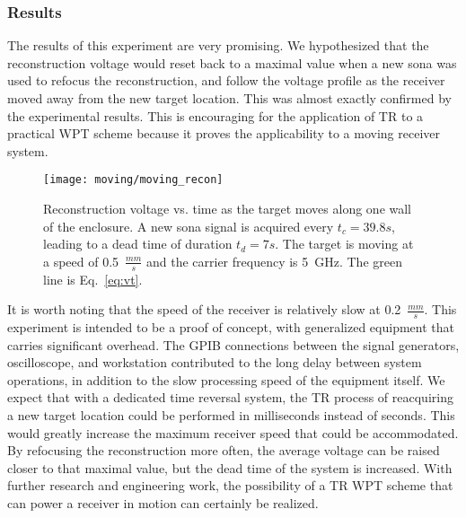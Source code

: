\subsubsection{Results}
\label{moving-results}

The results of this experiment are very promising. We hypothesized that the reconstruction \ptp{} voltage would reset back to a maximal value when a new sona was used to refocus the reconstruction, and follow the voltage profile as the receiver moved away from the new target location. This was almost exactly confirmed by the experimental results. This is encouraging for the application of TR to a practical WPT scheme because it proves the applicability to a moving receiver system.

\begin{figure}[t]
\centering
\texttt{[image: moving/moving\_recon]}
    \caption[\Ptp{} voltage of moving reconstructions]{Reconstruction \ptp{} voltage vs. time as the target moves along one wall of the enclosure. A new sona signal is acquired every $t_c = 39.8s$, leading to a dead time of duration $t_d = 7s$. The target is moving at a speed of 0.5~$\frac{mm}{s}$ and the carrier frequency is 5~GHz. The green line is Eq.~\ref{eq:vt}.}
    \label{fig:moving-recon}
\end{figure}

It is worth noting that the speed of the receiver is relatively slow at 0.2~$\frac{mm}{s}$. This experiment is intended to be a proof of concept, with generalized equipment that carries significant overhead. The GPIB connections between the signal generators, oscilloscope, and workstation contributed to the long delay between system operations, in addition to the slow processing speed of the equipment itself. We expect that with a dedicated time reversal system, the TR process of reacquiring a new target location could be performed in milliseconds instead of seconds. This would greatly increase the maximum receiver speed that could be accommodated. By refocusing the reconstruction more often, the average \ptp{} voltage can be raised closer to that maximal value, but the dead time of the system is increased. With further research and engineering work, the possibility of a TR WPT scheme that can power a receiver in motion can certainly be realized.
